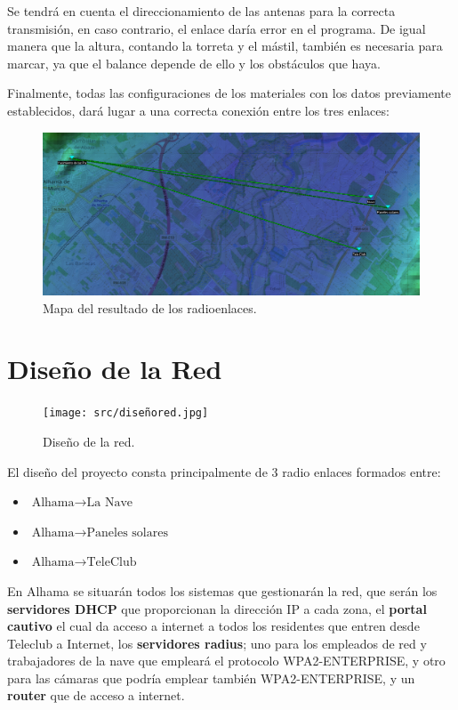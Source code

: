 \documentclass{article}
\begin{document}
Se tendrá en cuenta el direccionamiento de las antenas para la correcta transmisión, en caso contrario, el enlace daría error en el programa. De igual manera que la altura, contando la torreta y el mástil, también es necesaria para marcar, ya que el balance depende de ello y los obstáculos que haya.

\quad

Finalmente, todas las configuraciones de los materiales con los datos previamente establecidos, dará lugar a una correcta conexión entre los tres enlaces:
\newpage
\begin{figure}[ht]
    \centering
    \includegraphics[width=1\linewidth]{src/mapa radio.png}
    \caption{\label{fig:maparadio} Mapa del resultado de los radioenlaces.}
\end{figure}

\section{Diseño de la Red}


\begin{figure}[ht]
    \centering
    \texttt{[image: src/diseñored.jpg]}
    \caption{\label{fig:diseñored} Diseño de la red.}
\end{figure}

El diseño del proyecto consta principalmente de 3 radio enlaces formados entre:

\begin{itemize}
    \item $\text{Alhama} \rightarrow \text{La Nave}$
    \item $\text{Alhama} \rightarrow \text{Paneles solares}$
    \item $\text{Alhama} \rightarrow \text{TeleClub}$
\end{itemize}

En Alhama se situarán todos los sistemas que gestionarán la red, que serán los \textbf{servidores DHCP} que proporcionan la dirección IP a cada zona, el\textbf{ portal cautivo} el cual da acceso a internet a todos los residentes que entren desde Teleclub a Internet, los \textbf{servidores radius}; uno para los empleados de red y trabajadores de la nave que empleará el protocolo WPA2-ENTERPRISE, y otro para las cámaras que podría emplear también WPA2-ENTERPRISE, y un \textbf{router} que de acceso a internet.
\end{document}
